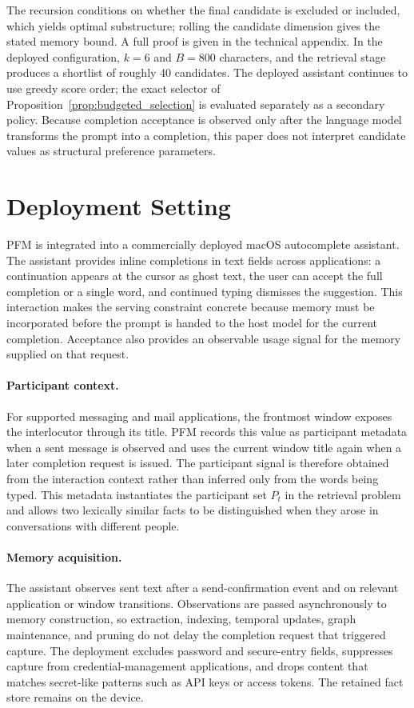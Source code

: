 \documentclass[letterpaper]{article} %
\begin{document}
The recursion conditions on whether the final candidate is excluded or included, which yields optimal substructure; rolling the candidate dimension gives the stated memory bound. A full proof is given in the technical appendix. In the deployed configuration, $k=6$ and $B=800$ characters, and the retrieval stage produces a shortlist of roughly 40 candidates. The deployed assistant continues to use greedy score order; the exact selector of Proposition~\ref{prop:budgeted_selection} is evaluated separately as a secondary policy. Because completion acceptance is observed only after the language model transforms the prompt into a completion, this paper does not interpret candidate values as structural preference parameters.

\section{Deployment Setting}

PFM is integrated into a commercially deployed macOS autocomplete assistant. The assistant provides inline completions in text fields across applications: a continuation appears at the cursor as ghost text, the user can accept the full completion or a single word, and continued typing dismisses the suggestion. This interaction makes the serving constraint concrete because memory must be incorporated before the prompt is handed to the host model for the current completion. Acceptance also provides an observable usage signal for the memory supplied on that request.

\paragraph{Participant context.} For supported messaging and mail applications, the frontmost window exposes the interlocutor through its title. PFM records this value as participant metadata when a sent message is observed and uses the current window title again when a later completion request is issued. The participant signal is therefore obtained from the interaction context rather than inferred only from the words being typed. This metadata instantiates the participant set $P_t$ in the retrieval problem and allows two lexically similar facts to be distinguished when they arose in conversations with different people.

\paragraph{Memory acquisition.} The assistant observes sent text after a send-confirmation event and on relevant application or window transitions. Observations are passed asynchronously to memory construction, so extraction, indexing, temporal updates, graph maintenance, and pruning do not delay the completion request that triggered capture. The deployment excludes password and secure-entry fields, suppresses capture from credential-management applications, and drops content that matches secret-like patterns such as API keys or access tokens. The retained fact store remains on the device.
\end{document}
